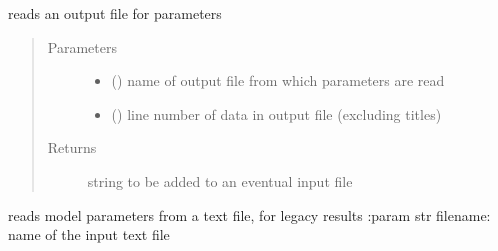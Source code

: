\documentclass[letterpaper,10pt,english]{sphinxmanual}
\begin{document}
\begin{fulllineitems}
\label{\detokenize{functions:pyqcm.read_from_file}}
\sphinxAtStartPar
reads an output file for parameters
\begin{quote}\begin{description}
\item[{Parameters}] \leavevmode\begin{itemize}
\item {} 
\sphinxAtStartPar
{} () \textendash{} name of output file from which parameters are read

\item {} 
\sphinxAtStartPar
{} () \textendash{} line number of data in output file (excluding titles)

\end{itemize}

\item[{Returns}] \leavevmode
\sphinxAtStartPar
string to be added to an eventual input file

\end{description}\end{quote}

\end{fulllineitems}


\begin{fulllineitems}
\label{\detokenize{functions:pyqcm.read_from_file_legacy}}
\sphinxAtStartPar
reads model parameters from a text file, for legacy results
:param str filename: name of the input text file

\end{fulllineitems}

\end{document}
